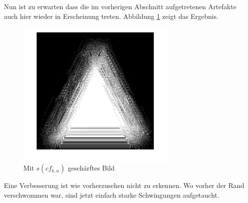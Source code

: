 Nun ist zu erwarten dass die im vorherigen Abschnitt aufgetretenen Artefakte auch hier wieder in Erscheinung treten.
Abbildung \ref{deconvolve:ergebnis} zeigt das Ergebnis.
\begin{figure}[h]
\centering
\includegraphics[width=0.7\textwidth]{./papers/deconvolve/pictures/dreieck_sharp.png}
\caption{Mit $s(cf_{k,n})$ \glqq geschärftes\grqq{} Bild\label{deconvolve:ergebnis}}
\end{figure}
 
Eine Verbesserung ist wie vorherzusehen nicht zu erkennen. Wo vorher der Rand verschwommen war, sind jetzt einfach starke Schwingungen aufgetaucht.